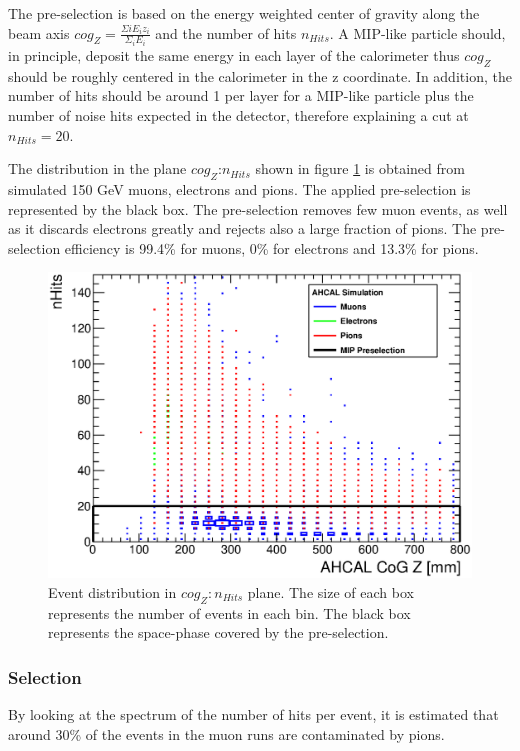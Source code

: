 The pre-selection is based on the energy weighted center of gravity along the beam axis $cog_Z = \frac{\Sigma{i} E_i z_i}{\Sigma_{i} E_i}$ and the number of hits $n_{Hits}$. A MIP-like particle should, in principle, deposit the same energy in each layer of the calorimeter thus $cog_Z$ should be roughly centered in the calorimeter in the z coordinate. In addition, the number of hits should be around 1 per layer for a MIP-like particle plus the number of noise hits expected in the detector, therefore explaining a cut at $n_{Hits} = 20$.

The distribution in the plane $cog_Z$:$n_{Hits}$ shown in figure \ref{fig:Muons_CoGZ_nHits} is obtained from simulated 150 GeV muons, electrons and pions. The applied pre-selection is represented by the black box. The pre-selection removes few muon events, as well as it discards electrons greatly and rejects also a large fraction of pions. The pre-selection efficiency is 99.4\% for muons, 0\% for electrons and 13.3\% for pions.

\begin{figure}[htbp!]
	\centering
	\includegraphics[width=0.7\linewidth]{../Thesis_Plots/Timing/Muons/Plots/SelectionCut_nHitsCoGZ_Muons.eps}
	\caption{Event distribution in $cog_Z:n_{Hits}$ plane. The size of each box represents the number of events in each bin. The black box represents the space-phase covered by the pre-selection.} \label{fig:Muons_CoGZ_nHits}
\end{figure}

\subsubsection{Selection}
\label{subsec:Muon_sel}

By looking at the spectrum of the number of hits per event, it is estimated that around 30\% of the events in the muon runs are contaminated by pions.

